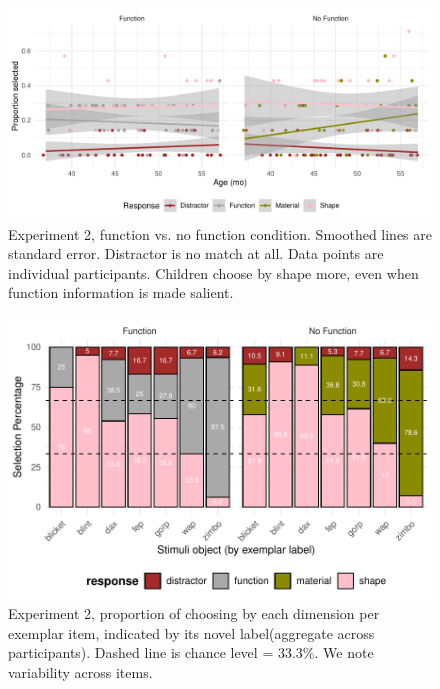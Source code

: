 \documentclass[10pt, letterpaper]{article}
\newenvironment{CodeChunk}{}{}
\begin{document}
\begin{CodeChunk}
\begin{figure}[!h]
\includegraphics[width=1\linewidth]{figs/jitter_function-1} \caption[Experiment 2, function vs]{Experiment 2, function vs. no function condition. Smoothed lines are standard error. Distractor is no match at all. Data points are individual participants. Children choose by shape more, even when function information is made salient.}\label{fig:jitter_function}
\end{figure}
\end{CodeChunk}

\begin{CodeChunk}
\begin{figure}[tb]
\includegraphics[width=1\linewidth]{figs/sec_exp_stim-1} \caption[Experiment 2, proportion of choosing by each dimension per exemplar item, indicated by its novel label(aggregate across participants)]{Experiment 2, proportion of choosing by each dimension per exemplar item, indicated by its novel label(aggregate across participants). Dashed line is chance level = 33.3\%. We note variability across items.}\label{fig:sec_exp_stim}
\end{figure}
\end{CodeChunk}
\end{document}
